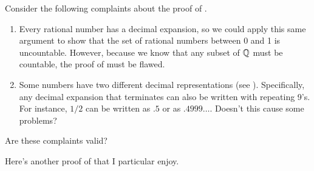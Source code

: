 \begin{remark}
  Consider the following complaints about the proof of
  .

  \begin{enumerate}
    \item Every rational number has a decimal expansion, so we could
      apply this same argument to show that the set of rational
      numbers between 0 and 1 is uncountable. However, because we
      know that any subset of $\mathbb Q$ must be countable, the proof of
       must be flawed.
    \item Some numbers have two different decimal representations
      (see ). Specifically, any decimal expansion
      that terminates can also be written with repeating 9's. For
      instance, $1/2$ can be written as $.5$ or as $.4999\dots$.
      Doesn't this cause some problems?
  \end{enumerate}

  Are these complaints valid?
\end{remark}

Here's another proof of 
that I particular enjoy.

